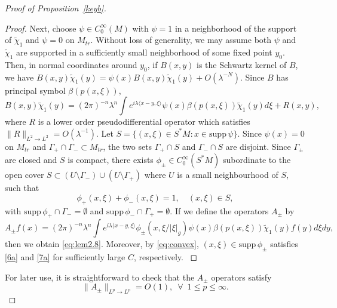 \documentclass[10pt]{amsart}
\newcommand{\la}{\lambda}
\newcommand{\supp}{\mathrm{supp }}
\newcommand{\1}{{\bf 1}}
\begin{document}
\begin{proof}[Proof of Proposition~\ref{keyb}]
\begin{proof}
{{Next, choose $\psi\in C_0^\infty{(M)}$ with $\psi=1$ in a neighborhood of the support of $\tilde\chi_1$  and $\psi=0$ on $M_{tr}$. Without loss of generality, we may assume both $\psi$ and $\tilde \chi_1$ are supported in a sufficiently small neighborhood of some fixed point $y_0$. Then, in normal coordinates around $y_0$, if $B(x,y)$ is the {Schwartz} kernel of $B$, 
we have $B(x,y)\tilde\chi_1(y)=\psi(x)B(x,y)\tilde \chi_1(y)+O(\la^{-N})$. {Since $B$ has principal symbol $\beta(p(x,\xi))$},
\begin{equation}\label{2.95a}
    B(x,y)\tilde\chi_1(y)=(2\pi)^{-n}\la^n\int e^{i\la\langle x-y,\xi \rangle} \psi(x){\beta(p(x,\xi))}\tilde\chi_1(y)d\xi +R(x,y),
\end{equation}
where $R$ is a lower order {pseudodifferential} operator which satisfies $ \|R\|_{L^2\to L^2}=O(\la^{-1})
$.
}}
{Let $S=\{(x,\xi)\in S^*M: x\in \supp\,\psi \}$. 
Since $\psi(x)=0$ on $M_{tr}$ and $\Gamma_+\cap \Gamma_- \subset M_{tr}$, the two sets $\Gamma_+\cap S$ and $\Gamma_-\cap S$ are disjoint. Since $\Gamma_\pm$ are closed and $S$ is compact, 
there exists $\phi_{\pm}\in C_0^{\infty}(S^*M)$ subordinate to the open cover $S\subset (U\setminus \Gamma_-)\cup (U\setminus \Gamma_+)$ where $U$ is a small neighbourhood of $S$, such that
\begin{equation}
    \phi_+(x,\xi) +\phi_-(x,\xi) =1,\quad (x,\xi)\in S,
\end{equation}
with $\supp\,\phi_+ \cap \Gamma_-=\emptyset$ 
 and $\supp\,\phi_- \cap \Gamma_+=\emptyset$. If we define the operators $A_\pm$ by 
\begin{equation}\label{10}
   A_\pm f(x)=(2\pi)^{-n}\la^n\int e^{i\la\langle x-y,\xi \rangle} \phi_{\pm}(x,\xi/|\xi|_g)\psi(x)\beta(p(x,\xi))\tilde\chi_1(y) f(y)d\xi dy,
\end{equation}
then we obtain \eqref{eq:lem2.8}. Moreover, by \eqref{eq:convex}, $(x,\xi)\in \supp \, \phi_{\pm}$ satisfies \eqref{6a} and \eqref{7a} for sufficiently large $C$, respectively.
}
\end{proof}
For later use, it is straightforward to check that the $A_\pm$ operators  satisfy 
\begin{equation}\label{bbound}
    \|A_\pm\|_{L^p\to L^p}=O(1),\,\,\,\forall\,\,\,1\le p\le \infty.
\end{equation}



\end{proof}
\end{document}
